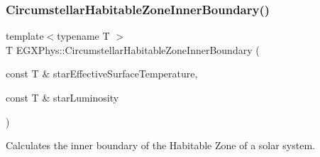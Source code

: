 \subsubsection{\texorpdfstring{Circumstellar\+Habitable\+Zone\+Inner\+Boundary()}{CircumstellarHabitableZoneInnerBoundary()}}
{\footnotesize\ttfamily template$<$typename T $>$ \\
T E\+G\+X\+Phys\+::\+Circumstellar\+Habitable\+Zone\+Inner\+Boundary (\begin{DoxyParamCaption}\item[{const T \&}]{star\+Effective\+Surface\+Temperature,  }\item[{const T \&}]{star\+Luminosity }\end{DoxyParamCaption})}



Calculates the inner boundary of the Habitable Zone of a solar system. 

